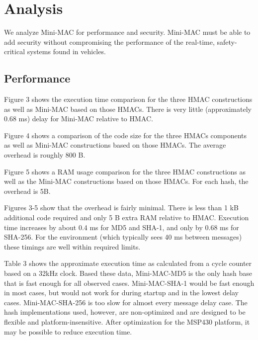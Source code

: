 \section{Analysis}
\label{analysis}



We analyze Mini-MAC for performance and security. Mini-MAC must be able to add security without compromising the performance of the real-time, safety-critical systems found in vehicles.

\subsection{Performance}
Figure 3 shows the execution time comparison for the three HMAC constructions as well as Mini-MAC based on those HMACs. There is very little (approximately 0.68 ms) delay for Mini-MAC relative to HMAC.

Figure 4 shows a comparison of the code size for the three HMACs components as well as Mini-MAC constructions based on those HMACs. The average overhead is roughly 800 B.

Figure 5 shows a RAM usage comparison for the three HMAC constructions as well as the Mini-MAC constructions based on those HMACs. For each hash, the overhead is 5B.

Figures 3-5 show that the overhead is fairly minimal. There is less than 1 kB additional code required and only 5 B extra RAM relative to HMAC. Execution time increases by about 0.4 ms for MD5 and SHA-1, and only by 0.68 ms for SHA-256. For the environment (which typically sees 40 ms between messages) these timings are well within required limits.

Table 3 shows the approximate execution time as calculated from a cycle counter based on a 32kHz clock. Based these data, Mini-MAC-MD5 is the only hash base that is fast enough for all observed cases. Mini-MAC-SHA-1 would be fast enough in most cases, but would not work for during startup and in the lowest delay cases. Mini-MAC-SHA-256 is too slow for almost every message delay case. The hash implementations used, however, are non-optimized and are designed to be flexible and platform-insensitive. After optimization for the MSP430 platform, it may be possible to reduce execution time.

